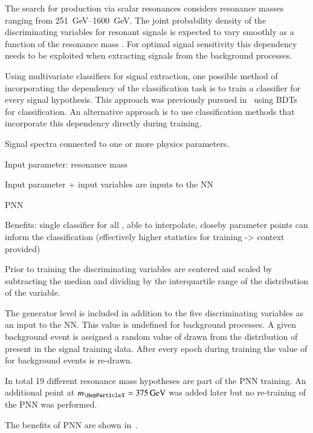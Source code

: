 The search for \HH production via scalar resonances considers
resonance masses ranging from \SIrange{251}{1600}{\GeV}. The joint
probability density of the discriminating variables for resonant \HH
signals is expected to vary smoothly as a function of the resonance
mass \mX. For optimal signal sensitivity this dependency needs to be
exploited when extracting signals from the background processes.

Using multivariate classifiers for signal extraction, one possible
method of incorporating the \mX dependency of the classification task
is to train a classifier for every signal hypothesis. This approach
was previously pursued in~\cite{HIGG-2016-16-witherratum} using BDTs
for classification. An alternative approach is to use classification
methods that incorporate this dependency directly during training.

Signal spectra connected to one or more physics parameters.

Input parameter: resonance mass \mX

Input parameter + input variables are inputs to the NN

PNN~\cite{Baldi:2016fzo}

Benefits: single classifier for all \mX, able to interpolate, closeby
parameter points can inform the classification (effectively higher
statistics for training -> context provided)

Prior to training the discriminating variables are centered and scaled
by subtracting the median and dividing by the interquartile range of
the distribution of the variable.

The generator level \mX is included in addition to the five
discriminating variables as an input to the NN. This value is
undefined for background processes. A given background event is
assigned a random value of \mX drawn from the distribution of \mX
present in the signal training data. After every epoch during training
the value of \mX for background events is re-drawn.

In total 19 different resonance mass hypotheses are part of the PNN
training. An additional point at $\mX = \SI{375}{\GeV}$ was added
later but no re-training of the PNN was performed.

The benefits of PNN are shown in~.


